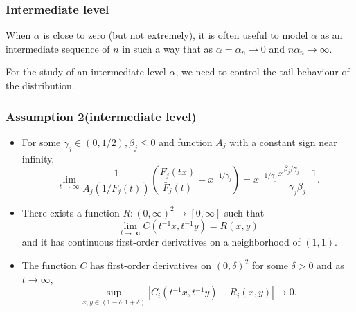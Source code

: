 \documentclass{beamer}
\newcommand{\suit}[1]{\left(#1\right)}
\newcommand{\abs}[1]{\left\vert#1\right\vert}
\begin{document}
\begin{frame}
    \frametitle{Intermediate level}
When $\alpha$ is close to zero (but not extremely), it is often useful to model $\alpha$ as an intermediate sequence of $n$ in such a way that as $\alpha=\alpha_n\to 0$ and $n\alpha_n \to \infty$. 

For the study of an intermediate level $\alpha$, we need to control the tail behaviour of the distribution.
\end{frame}


\begin{frame}
    \frametitle{Assumption 2(intermediate level)}
\begin{itemize}
    \item For some $\gamma_j \in (0,1/2), \beta_j \le 0$ and function $A_j$ with a constant sign near infinity,
        $$
            \lim_{t\to \infty} \frac{1}{A_j(1/\bar{F}_j(t))}\suit{\frac{\bar{F}_j(tx)}{\bar{F}_j(t)}-x^{-1/\gamma_j}} = x^{-1/\gamma_j}\frac{x^{\beta_j/\gamma_j}-1}{\gamma_j \beta_j}.
        $$
    \item There exists a function $R:(0,\infty)^2\to [0,\infty]$ such that
            $$
                \lim_{t\to \infty} C(t^{-1}x,t^{-1}y)=R(x,y)
            $$
            and it has continuous first-order derivatives on a neighborhood of $(1,1)$.
    \item  The function $C$ has first-order derivatives on $(0,\delta)^2$ for some $\delta>0$ and as $t\to \infty$,
    $$
    \sup_{x,y \in (1-\delta,1+\delta)}\abs{C_i(t^{-1}x,t^{-1}y)-R_i(x,y)}\to 0.
    $$
\end{itemize}
    

\end{frame}
\end{document}
